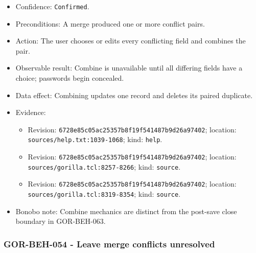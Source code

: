 \documentclass[
  letterpaper,
]{article}
\newcommand{\passthrough}[1]{#1}
\providecommand{\tightlist}{%
  \setlength{\itemsep}{0pt}\setlength{\parskip}{0pt}}
\begin{document}
\begin{itemize}
\tightlist
\item
  Confidence: \passthrough{\lstinline!Confirmed!}.
\item
  Preconditions: A merge produced one or more conflict pairs.
\item
  Action: The user chooses or edits every conflicting field and combines the pair.
\item
  Observable result: Combine is unavailable until all differing fields have a choice; passwords begin concealed.
\item
  Data effect: Combining updates one record and deletes its paired duplicate.
\item
  Evidence:

  \begin{itemize}
  \tightlist
  \item
    Revision: \nolinkurl{6728e85c05ac25357b8f19f541487b9d26a97402}; location: \nolinkurl{sources/help.txt:1039-1068};
    kind: \passthrough{\lstinline!help!}.
  \item
    Revision: \nolinkurl{6728e85c05ac25357b8f19f541487b9d26a97402}; location: \nolinkurl{sources/gorilla.tcl:8257-8266};
    kind: \passthrough{\lstinline!source!}.
  \item
    Revision: \nolinkurl{6728e85c05ac25357b8f19f541487b9d26a97402}; location: \nolinkurl{sources/gorilla.tcl:8319-8354};
    kind: \passthrough{\lstinline!source!}.
  \end{itemize}
\item
  Bonobo note: Combine mechanics are distinct from the post-save close boundary in GOR-BEH-063.
\end{itemize}

\subsubsection{GOR-BEH-054 - Leave merge conflicts unresolved}\label{gor-beh-054---leave-merge-conflicts-unresolved}
\end{document}
